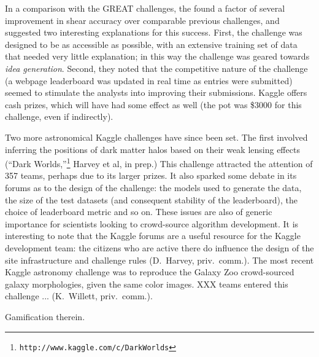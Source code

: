 \documentclass{ar2e}
\begin{document}
In a comparison with the GREAT challenges, the \citeauthor{KitchingEtal2013b}
found a factor of several improvement in shear accuracy over comparable previous
challenges, and suggested two interesting explanations for this success. First,
the challenge was designed to be as accessible as possible, with an extensive
training set of data that needed very little explanation; in this way the
challenge was geared towards {\it idea generation}. Second, they noted that the
competitive  nature of the challenge (a webpage leaderboard was updated in real
time as entries were submitted) seemed to stimulate the analysts into improving
their submissions. Kaggle offers cash prizes, which will have had some effect as
well (the pot was \$3000 for this challenge, even if indirectly).

Two more astronomical Kaggle challenges have since been set. The first involved
inferring the positions of dark matter halos based on their weak lensing effects
(``Dark Worlds,''\footnote{\texttt{http://www.kaggle.com/c/DarkWorlds}} Harvey
et al, in prep.) This challenge attracted the attention of 357 teams, perhaps
due to its larger prizes. It also sparked some debate in its forums as to the
design of the challenge: the models used to generate the data, the size of the
test datasets (and consequent stability of the leaderboard),  the choice of
leaderboard metric and so on. These issues are also of generic importance for
scientists looking to crowd-source algorithm development. It is interesting to
note that the Kaggle forums are a useful resource for the Kaggle development
team: the citizens who are active there do influence the design of the site
infrastructure and challenge rules (D.~Harvey, priv.~comm.). The most recent
Kaggle astronomy challenge was to reproduce the Galaxy Zoo crowd-sourced galaxy
morphologies, given the same color images. XXX teams entered this challenge ...
(K.\ Willett, priv.\ comm.).

% 

Gamification therein.

\end{document}

